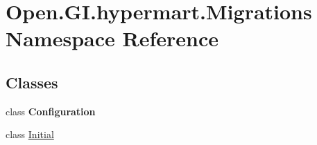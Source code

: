 \hypertarget{namespace_open_1_1_g_i_1_1hypermart_1_1_migrations}{}\section{Open.\+G\+I.\+hypermart.\+Migrations Namespace Reference}
\label{namespace_open_1_1_g_i_1_1hypermart_1_1_migrations}
\subsection*{Classes}
\begin{DoxyCompactItemize}
\item 
class {\bfseries Configuration}
\item 
class \hyperlink{class_open_1_1_g_i_1_1hypermart_1_1_migrations_1_1_initial}{Initial}
\end{DoxyCompactItemize}
